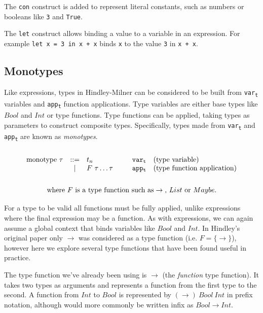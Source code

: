 \documentclass[a4paper,fleqn,oneside,12pt]{report}
\begin{document}
The \texttt{con} construct is added to represent literal constants, such as numbers or booleans like \texttt{3} and \texttt{True}.

The \texttt{let} construct allows binding a value to a variable in an expression. For example \texttt{let x = 3 in x + x} binds \texttt{x} to the value \texttt{3} in \texttt{x + x}.

\subsection{Monotypes}

Like expressions, types in Hindley-Milner can be considered to be built from \texttt{var\textsubscript{t}} variables and \texttt{app\textsubscript{t}} function applications. Type variables are either base types like $Bool$ and $Int$ or type functions. Type functions can be applied, taking types as parameters to construct composite types. Specifically, types made from \texttt{var\textsubscript{t}} and \texttt{app\textsubscript{t}} are known as \textit{monotypes}.
$$\begin{array}{lcllll}
  \\
    \textrm{monotype}\ \tau & ::= & t_n               & \hspace{0.25cm} & \mathtt{var_t} & \textrm{(type variable)}\\
                          & \vert & F\ \tau \dots \tau &                 & \mathtt{app_t} & \textrm{(type function application)}\\
  \\
\end{array}
$$
\vspace{-0.8cm}
$$
\textrm{where }F\textrm{ is a type function such as}\rightarrow\textrm{, }List\textrm{ or }Maybe.\\
$$
\vspace{0cm} %

For a type to be valid all functions must be fully applied, unlike expressions where the final expression may be a function. As with expressions, we can again assume a global context that binds variables like $Bool$ and $Int$. In Hindley’s original paper only $\rightarrow$ was considered as a type function (i.e. $F = \{ \rightarrow \}$), however here we explore several type functions that have been found useful in practice.

The type function we've already been using is $\rightarrow$ (the \textit{function} type function). It takes two types as arguments and represents a function from the first type to the second. A function from $Int$ to $Bool$ is represented by $(\rightarrow)\ Bool\ Int$ in prefix notation, although would more commonly be written infix as $Bool \rightarrow Int$.
\end{document}
